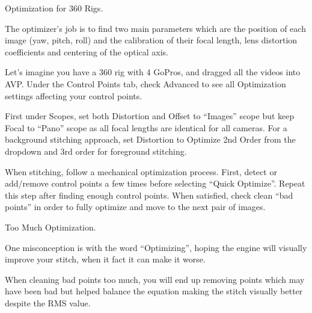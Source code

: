 \begin{fullwidth}
\clearpage
{\large Optimization for 360 Rigs. \par}

The optimizer’s job is to find two main parameters which are the position of each image (yaw, pitch, roll) and the calibration of their focal length, lens distortion coefficients and centering of the optical axis. 


Let’s imagine you have a 360 rig with 4 GoPros, and dragged all the videos into AVP. Under the Control Points tab, check Advanced to see all Optimization settings affecting your control points.


First under Scopes, set both Distortion and Offset to “Images” scope but keep Focal to “Pano” scope as all focal lengths are identical for all cameras. For a background stitching approach, set Distortion to Optimize 2nd Order from the dropdown and 3rd order for foreground stitching.


When stitching, follow a mechanical optimization process. First, detect or add/remove control points a few times before selecting “Quick Optimize”. Repeat this step after finding enough control points. When satisfied, check clean “bad points” in order to fully optimize and move to the next pair of images.


{\large Too Much Optimization. \par}

One misconception is with the word “Optimizing”, hoping the engine will visually improve your stitch, when it fact it can make it worse.

When cleaning bad points too much, you will end up removing points which may have been bad but helped balance the equation making the stitch visually better despite the RMS value.


\clearpage
\end{fullwidth}
